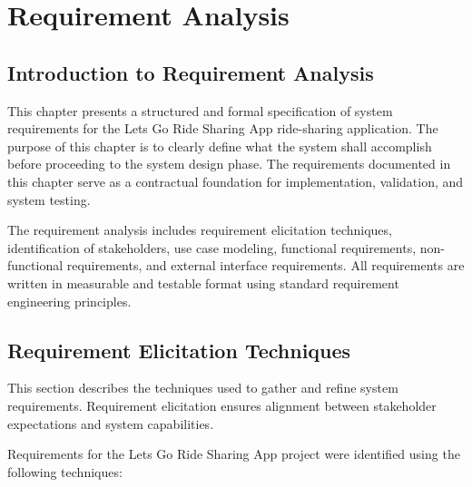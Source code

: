 
\chapter{Requirement Analysis}

\section{Introduction to Requirement Analysis}

This chapter presents a structured and formal specification of system requirements for the Lets Go Ride Sharing App ride-sharing application. The purpose of this chapter is to clearly define what the system shall accomplish before proceeding to the system design phase. The requirements documented in this chapter serve as a contractual foundation for implementation, validation, and system testing.

The requirement analysis includes requirement elicitation techniques, identification of stakeholders, use case modeling, functional requirements, non-functional requirements, and external interface requirements. All requirements are written in measurable and testable format using standard requirement engineering principles.

\section{Requirement Elicitation Techniques}

This section describes the techniques used to gather and refine system requirements. Requirement elicitation ensures alignment between stakeholder expectations and system capabilities.

Requirements for the Lets Go Ride Sharing App project were identified using the following techniques:

